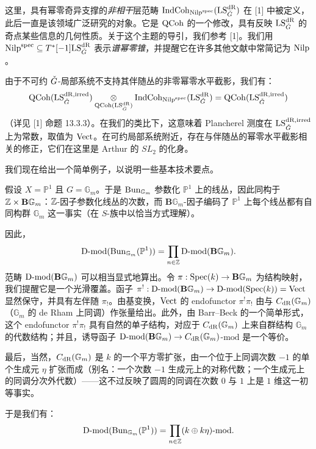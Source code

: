 这里，具有幂零奇异支撑的\emph{非相干}层范畴 $\mathrm{IndCoh}_{\mathrm{Nilp}^{\mathrm{spec}}}(\mathrm{LS}^{\mathrm{dR}}_{\check{G}})$ 在 [1] 中被定义，此后一直是该领域广泛研究的对象。它是 $\mathrm{QCoh}$ 的一个修改，具有反映 $\mathrm{LS}^{\mathrm{dR}}_{\check{G}}$ 的奇点某些信息的几何性质。关于这个主题的导引，我们参考 [1]。我们用 $\mathrm{Nilp}^{\mathrm{spec}} \subseteq T^*[-1]\mathrm{LS}^{\mathrm{dR}}_{\check{G}}$ 表示\emph{谱幂零锥}，并提醒它在许多其他文献中常简记为 $\mathrm{Nilp}$。

由于不可约 $\check{G}$-局部系统不支持其伴随丛的非零幂零水平截影，我们有：
\[
  \mathrm{QCoh}(\mathrm{LS}^{\mathrm{dR},\mathrm{irred}}_{\check{G}}) \underset{\mathrm{QCoh}(\mathrm{LS}^{\mathrm{dR}}_{\check{G}})}{\otimes} \mathrm{IndCoh}_{\mathrm{Nilp}^{\mathrm{spec}}}(\mathrm{LS}^{\mathrm{dR}}_{\check{G}}) = \mathrm{QCoh}(\mathrm{LS}^{\mathrm{dR},\mathrm{irred}}_{\check{G}})
\]
（详见 [1] 命题 13.3.3）。在我们的类比下，这意味着 Plancherel 测度在 $\mathrm{LS}^{\mathrm{dR},\mathrm{irred}}_{\check{G}}$ 上为常数，取值为 $\mathrm{Vect}$。在可约局部系统附近，存在与伴随丛的幂零水平截影相关的修正，它们在这里是 Arthur 的 $SL_2$ 的化身。

\pnum{}我们现在给出一个简单例子，以说明一些基本技术要点。

假设 $X = \mathbb{P}^1$ 且 $G = \mathbb{G}_m$。于是 $\mathrm{Bun}_{\mathbb{G}_m}$ 参数化 $\mathbb{P}^1$ 上的线丛，因此同构于 $\mathbb{Z} \times \mathbf{B}\mathbb{G}_m$：$\mathbb{Z}$-因子参数化线丛的次数，而 $\mathbf{B}\mathbb{G}_m$-因子编码了 $\mathbb{P}^1$ 上每个线丛都有自同构群 $\mathbb{G}_m$ 这一事实（在 $S$-族中以恰当方式理解）。

因此，
\[
  \mathrm{D}\text{-}\mathrm{mod}(\mathrm{Bun}_{\mathbb{G}_m}(\mathbb{P}^1)) = \prod_{n \in \mathbb{Z}} \mathrm{D}\text{-}\mathrm{mod}(\mathbf{B}\mathbb{G}_m).
\]
范畴 $\mathrm{D}\text{-}\mathrm{mod}(\mathbf{B}\mathbb{G}_m)$ 可以相当显式地算出。令 $\pi: \operatorname{Spec}(k) \to \mathbf{B}\mathbb{G}_m$ 为结构映射，我们提醒它是一个光滑覆盖。函子 $\pi^!: \mathrm{D}\text{-}\mathrm{mod}(\mathbf{B}\mathbb{G}_m) \to \mathrm{D}\text{-}\mathrm{mod}(\operatorname{Spec}(k)) = \mathrm{Vect}$ 显然保守，并具有左伴随 $\pi_!$。由基变换，$\mathrm{Vect}$ 的 endofunctor $\pi^! \pi_!$ 由与 $C_{\mathrm{dR}}(\mathbb{G}_m)$（$\mathbb{G}_m$ 的 de Rham 上同调）作张量给出。此外，由 Barr--Beck 的一个简单形式，这个 endofunctor $\pi^! \pi_!$ 具有自然的单子结构，对应于 $C_{\mathrm{dR}}(\mathbb{G}_m)$ 上来自群结构 $\mathbb{G}_m$ 的代数结构；并且，诱导函子 $\mathrm{D}\text{-}\mathrm{mod}(\mathbf{B}\mathbb{G}_m) \to C_{\mathrm{dR}}(\mathbb{G}_m)$-$\mathrm{mod}$ 是一个等价。

最后，当然，$C_{\mathrm{dR}}(\mathbb{G}_m)$ 是 $k$ 的一个平方零扩张，由一个位于上同调次数 $-1$ 的单个生成元 $\eta$ 扩张而成（别名：一个次数 $-1$ 生成元上的对称代数；一个生成元上的同调分次外代数）——这不过反映了圆周的同调在次数 $0$ 与 $1$ 上是 $1$ 维这一初等事实。

于是我们有：
\begin{equation}
  \mathrm{D}\text{-}\mathrm{mod}(\mathrm{Bun}_{\mathbb{G}_m}(\mathbb{P}^1)) = \prod_{n \in \mathbb{Z}} (k \oplus k\eta)\text{-}\mathrm{mod}.
\end{equation}

